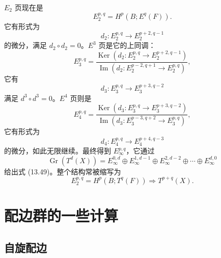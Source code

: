 $E_2$ 页现在是
\begin{equation}
E_2^{p,q}=H^p(B;E^q(F)). \tag{13.50}
\end{equation}
它有形式为
\begin{equation}
d_2:E_2^{p,q}\to E_2^{p+2,q-1} \tag{13.51}
\end{equation}
的微分，满足 $d_2\circ d_2=0$。$E^3$ 页是它的上同调：
\begin{equation}
E_3^{p,q}=\frac{\operatorname{Ker}\left(d_2:E_2^{p,q}\to E_2^{p+2,q-1}\right)}
{\operatorname{Im}\left(d_2:E_2^{p-2,q+1}\to E_2^{p,q}\right)}, \tag{13.52}
\end{equation}
它有
\begin{equation}
d_3:E_3^{p,q}\to E_3^{p+3,q-2} \tag{13.53}
\end{equation}
满足 $d^3\circ d^3=0$。$E^4$ 页则是
\begin{equation}
E_4^{p,q}=\frac{\operatorname{Ker}\left(d_3:E_3^{p,q}\to E_3^{p+3,q-2}\right)}
{\operatorname{Im}\left(d_3:E_3^{p-3,q+2}\to E_3^{p,q}\right)}, \tag{13.54}
\end{equation}
它有形式为
\begin{equation}
d_4:E_4^{p,q}\to E_4^{p+4,q-3} \tag{13.55}
\end{equation}
的微分，如此无限继续。最终得到 $E_\infty^{p,q}$，它通过
\begin{equation}
\operatorname{Gr}(T^d(X))=E_\infty^{0,d}\oplus E_\infty^{1,d-1}\oplus E_\infty^{2,d-2}\oplus\cdots\oplus E_\infty^{d,0} \tag{13.56}
\end{equation}
给出式 (13.49)。整个结构常被缩写为
\begin{equation}
E_2^{p,q}=H^p(B;T^q(F))\Rightarrow T^{p+q}(X). \tag{13.57}
\end{equation}


\section{配边群的一些计算}

\subsection{自旋配边}

